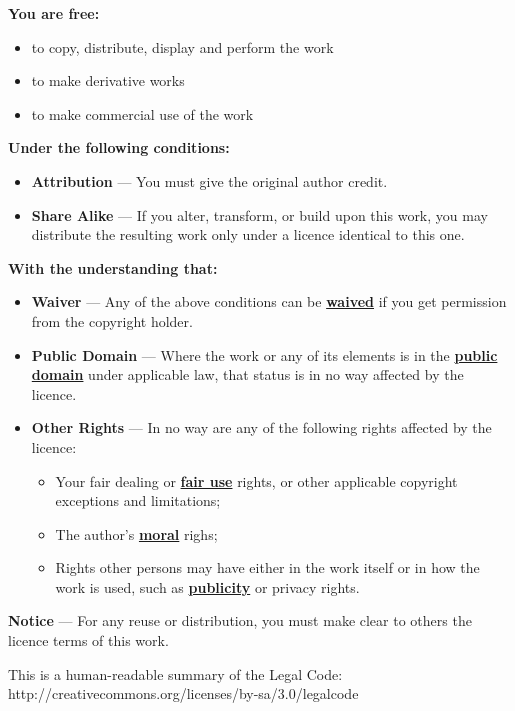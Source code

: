 \begin{center}
\begin{minipage}{0.8 \textwidth}
\vspace{0.75cm}%
\textbf{You are free:}
\begin{itemize}
\item to copy, distribute, display and perform the work
\item to make derivative works
\item to make commercial use of the work
\end{itemize}
\vspace{1cm}

\textbf{Under the following conditions:}
\begin{itemize}
\item\textbf{Attribution} --- You must give the original author credit.
\item\textbf{Share Alike} --- If you alter, transform, or build upon this work, you may distribute the resulting work only under a licence identical to this one.
\end{itemize}

\vspace{1cm}

\textbf{With the understanding that:}
\begin{itemize}
\item\textbf{Waiver} --- Any of the above conditions can be \textbf{\underline{waived}} if you get permission from the copyright holder.

\item\textbf{Public Domain} --- Where the work or any of its elements is in the \textbf{\underline{public domain}} under applicable law, that status is in no way affected by the licence.

\item\textbf{Other Rights} --- In no way are any of the following rights affected by the licence:
\begin{itemize}
\item Your fair dealing or \textbf{\underline{fair use}} rights, or other applicable copyright exceptions and limitations;
\item The author's \textbf{\underline{moral}} righs;
\item Rights other persons may have either in the work itself or in how the work is used, such as \textbf{\underline{publicity}} or privacy rights.
\end{itemize}

\end{itemize}

\vspace{0.5cm}
\begin{center}
\textbf{Notice} --- For any reuse or distribution, you must make clear to others the licence terms of this work.
\end{center}

\vspace{0.5cm}
\begin{center}
This is a human-readable summary of the Legal Code: http://creativecommons.org/licenses/by-sa/3.0/legalcode
\end{center}
\end{minipage}
\end{center}
